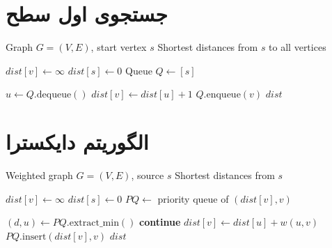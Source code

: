 \documentclass{matinbook}
\begin{document}
\section{جستجوی اول سطح}

\begin{latin}
\begin{algorithm}
\begin{algorithmic}[1]
    \Require Graph $G = (V, E)$, start vertex $s$
    \Ensure Shortest distances from $s$ to all vertices
    
        \State $dist[v] \gets \infty$
    \EndFor
    \State $dist[s] \gets 0$
    \State Queue $Q \gets [s]$
    
        \State $u \gets Q.\text{dequeue}()$
                \State $dist[v] \gets dist[u] + 1$
                \State $Q.\text{enqueue}(v)$
            \EndIf
        \EndFor
    \EndWhile
    \State \Return $dist$
\end{algorithmic}
\end{algorithm}
\end{latin}

\section{الگوریتم دایکسترا}

\begin{latin}
\begin{algorithm}
\begin{algorithmic}[1]
    \Require Weighted graph $G = (V, E)$, source $s$
    \Ensure Shortest distances from $s$
    
        \State $dist[v] \gets \infty$
    \EndFor
    \State $dist[s] \gets 0$
    \State $PQ \gets$ priority queue of $(dist[v], v)$
    
        \State $(d, u) \gets PQ.\text{extract\_min}()$
         \textbf{continue} \EndIf
                \State $dist[v] \gets dist[u] + w(u,v)$
                \State $PQ.\text{insert}(dist[v], v)$
            \EndIf
        \EndFor
    \EndWhile
    \State \Return $dist$
\end{algorithmic}
\end{algorithm}
\end{latin}
\end{document}
